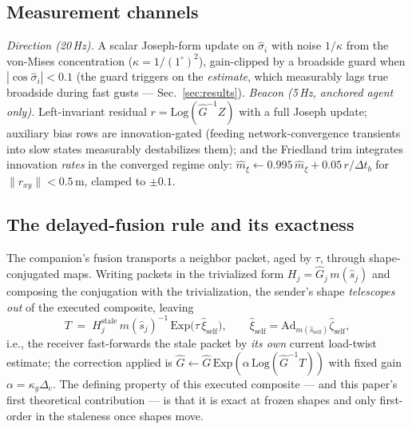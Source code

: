 \documentclass[letterpaper, 10pt, journal]{IEEEtran}
\begin{document}
\subsection{Measurement channels}
\emph{Direction (20\,Hz).} A scalar Joseph-form update on $\hat\sigma_i$ with
noise $1/\kappa$ from the von-Mises concentration
($\kappa = 1/(1^\circ)^2$), gain-clipped by a broadside guard when
$|\cos\hat\sigma_i| < 0.1$ (the guard triggers on the \emph{estimate}, which
measurably lags true broadside during fast gusts --- Sec.~\ref{sec:results}).
\emph{Beacon (5\,Hz, anchored agent only).} Left-invariant residual
$r = \mathrm{Log}(\hat G^{-1} Z)$ with a full Joseph update; auxiliary bias
rows are innovation-gated (feeding network-convergence transients into slow
states measurably destabilizes them); and the Friedland trim integrates
innovation \emph{rates} in the converged regime only:
$\hat m_\xi \leftarrow 0.995\,\hat m_\xi + 0.05\, r/\Delta t_b$ for
$\|r_{xy}\| < 0.5$\,m, clamped to $\pm 0.1$.

\subsection{The delayed-fusion rule and its exactness}
The companion's fusion transports a neighbor packet, aged by $\tau$, through
shape-conjugated maps. Writing packets in the trivialized form
$H_j = \hat G_j\, m(\hat s_j)$ and composing the conjugation with the
trivialization, the sender's shape \emph{telescopes out} of the executed
composite, leaving
\begin{equation}\label{eq:composite}
T \;=\; H^{\mathrm{stale}}_j\, m(\hat s_j)^{-1}\,
\mathrm{Exp}\!\bigl(\tau\,\hat\xi_{\mathrm{self}}\bigr),
\qquad
\hat\xi_{\mathrm{self}} = \mathrm{Ad}_{m(\hat s_{\mathrm{self}})}\hat\zeta_{\mathrm{self}},
\end{equation}
i.e., the receiver fast-forwards the stale packet by \emph{its own} current
load-twist estimate; the correction applied is $\hat G \leftarrow \hat G\,
\mathrm{Exp}(\alpha\, \mathrm{Log}(\hat G^{-1} T))$ with fixed gain
$\alpha = \kappa_g \Delta_c$. The defining property of this executed composite
--- and this paper's first theoretical contribution --- is that it is exact at
frozen shapes and only first-order in the staleness once shapes move.
\end{document}
